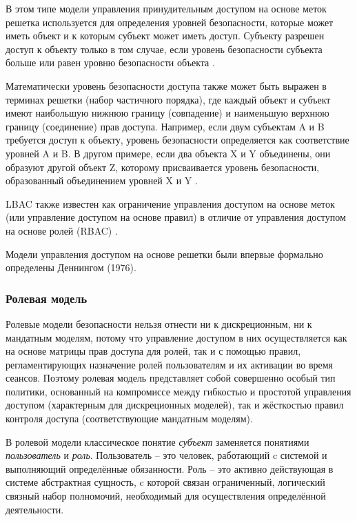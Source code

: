 {В этом типе модели управления принудительным доступом на основе меток решетка используется для определения уровней 
безопасности, которые может иметь объект и к которым субъект может иметь доступ. Субъекту разрешен доступ к объекту 
только в том случае, если уровень безопасности субъекта больше или равен уровню безопасности объекта \autocite{LBAC}.

Математически уровень безопасности доступа также может быть выражен в терминах решетки (набор частичного порядка), 
где каждый объект и субъект имеют наибольшую нижнюю границу (совпадение) и наименьшую верхнюю границу (соединение) 
прав доступа. Например, если двум субъектам A и B требуется доступ к объекту, уровень безопасности определяется как 
соответствие уровней A и B. В другом примере, если два объекта X и Y объединены, они образуют другой объект Z, 
которому присваивается уровень безопасности, образованный объединением уровней X и Y \autocite{LBAC}.

LBAC также известен как ограничение управления доступом на основе меток (или управление доступом на основе правил) 
в отличие от управления доступом на основе ролей (RBAC) \autocite{LBAC}.

Модели управления доступом на основе решетки были впервые формально определены Деннингом (1976).

\subsubsection{Ролевая модель}

Ролевые модели безопасности нельзя отнести ни к дискреционным, ни к мандатным моделям, потому что 
управление доступом в них осуществляется как на основе матрицы прав доступа для ролей, так и с помощью 
правил, регламентирующих назначение ролей пользователям и их активации во время сеансов. Поэтому 
ролевая модель представляет собой совершенно особый тип политики, основанный на компромиссе между 
гибкостью и простотой управления доступом (характерным для дискреционных моделей), так и жёсткостью 
правил контроля доступа (соответствующие мандатным моделям).

В ролевой модели классическое понятие \textit{субъект} заменяется понятиями \textit{пользователь} и 
\textit{роль}. Пользователь -- это человек, работающий c системой и выполняющий определённые 
обязанности. Роль -- это активно действующая в системе абстрактная сущность, c которой связан 
ограниченный, логический связный набор полномочий, необходимый для осуществления определённой деятельности.

}
